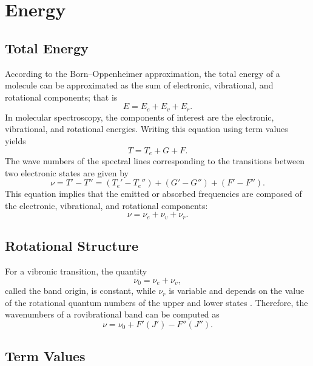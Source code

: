 \chapter{Energy}

\section{Total Energy}

According to the Born--Oppenheimer approximation, the total energy of a molecule can be approximated as the sum of electronic, vibrational, and rotational components; that is \cite[149]{herzbergMolecularSpectraMolecular1950}
\begin{equation*}
    E = E_e + E_v + E_r.
\end{equation*}
In molecular spectroscopy, the components of interest are the electronic, vibrational, and rotational energies. Writing this equation using term values yields
\begin{equation*}
    T = T_e + G + F.
\end{equation*}
The wave numbers of the spectral lines corresponding to the transitions between two electronic states are given by
\begin{equation*}
    \nu = T' - T'' = (T_e' - T_e'') + (G' - G'') + (F' - F'').
\end{equation*}
This equation implies that the emitted or absorbed frequencies are composed of the electronic, vibrational, and rotational components:
\begin{equation*}
    \nu = \nu_e + \nu_v + \nu_r.
\end{equation*}

\section{Rotational Structure}

For a vibronic transition, the quantity
\begin{equation*}
    \nu_0 = \nu_e + \nu_v,
\end{equation*}
called the band origin, is constant, while $\nu_r$ is variable and depends on the value of the rotational quantum numbers of the upper and lower states \cite[168]{herzbergMolecularSpectraMolecular1950}. Therefore, the wavenumbers of a rovibrational band can be computed as
\begin{equation*}
    \nu = \nu_0 + F'(J') - F''(J'').
\end{equation*}

\section{Term Values}


